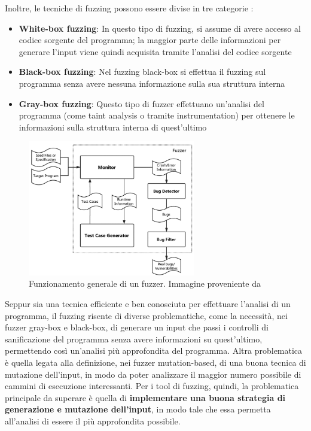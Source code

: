\documentclass[../main.tex]{subfiles}
\begin{document}
Inoltre, le tecniche di fuzzing possono essere divise in tre categorie \cite{Fuzzing_survey}:
\begin{itemize}
    \item \textbf{White-box fuzzing}: In questo tipo di fuzzing, si assume di avere accesso al codice sorgente del programma; la maggior parte delle informazioni per generare l'input viene quindi acquisita tramite l'analisi del codice sorgente
    \item \textbf{Black-box fuzzing}: Nel fuzzing black-box si effettua il fuzzing sul programma senza avere nessuna informazione sulla sua struttura interna
    \item \textbf{Gray-box fuzzing}: Questo tipo di fuzzer effettuano un'analisi del programma (come taint analysis o tramite instrumentation) per ottenere le informazioni sulla struttura interna di quest'ultimo
\end{itemize}
\begin{figure}[H]
    \centering
    \includegraphics[width = 0.65\textwidth]{../images/Fuzzing.png}
    \caption{Funzionamento generale di un fuzzer. Immagine proveniente da \cite{Fuzzing_soa}}
\end{figure}
Seppur sia una tecnica efficiente e ben conosciuta per effettuare l'analisi di un programma, il fuzzing risente di diverse problematiche, come la necessità, nei fuzzer gray-box e black-box, di generare un input che passi i controlli di sanificazione del programma senza avere
informazioni su quest'ultimo, permettendo così un'analisi più approfondita del programma. Altra problematica è quella legata alla definizione, nei fuzzer mutation-based, di una buona tecnica di mutazione dell'input, in modo da poter analizzare il maggior numero
possibile di cammini di esecuzione interessanti. Per i tool di fuzzing, quindi, la problematica principale da superare è quella di \textbf{implementare una buona strategia di generazione e mutazione dell'input}, in modo tale che essa permetta all'analisi di essere il più approfondita possibile.
\end{document}
